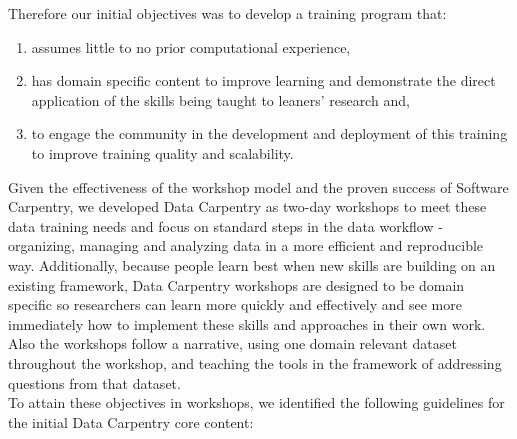 \documentclass[15]{idcc}
\begin{document}
Therefore our initial objectives was to develop a training program that:
\begin{enumerate} 
\item assumes little to no
prior computational experience, 
\item has domain specific content to improve learning and demonstrate
the direct application of the skills being taught to leaners' research and,
\item to engage the community in the
development and deployment of this training to improve training quality and scalability.
\end{enumerate}

Given the effectiveness of the workshop model and the proven success of Software Carpentry, we developed
Data Carpentry as two-day workshops to meet these data training needs and focus on standard steps in the data workflow -
organizing, managing and analyzing data
in a more efficient and reproducible way. Additionally, because people learn best when new skills are building on
an existing framework, Data Carpentry workshops are designed to be domain specific so researchers can learn more
quickly and effectively and see more
immediately how to implement these skills and approaches in their own work. Also the workshops follow a narrative, using one
domain relevant dataset throughout the workshop, and teaching the tools in the framework of addressing questions from
that dataset.\\

To attain these objectives in workshops, we identified the following guidelines for the initial Data Carpentry core content:
\end{document}
